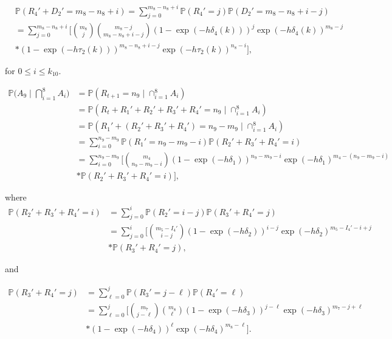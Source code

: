\documentclass[a4paper]{article}
\theoremstyle{remark}
\begin{document}

\begin{equation*}
\begin{split}
&\mathbb{P}(R_{4}'+D_{2}'=m_8-n_8+i)=\sum_{j=0}^{m_8-n_8+i} \mathbb{P}(R_{4}'=j)\mathbb{P}(D_{2}'=m_8-n_8+i-j)\\
&=\sum_{j=0}^{m_8-n_8+i}\Bigg[{m_8 \choose j}{m_8-j \choose m_8-n_8+i-j}(1-\exp(-h\delta_4(k)))^{j}\exp(-h\delta_4(k))^{m_8-j}\\
&*(1-\exp(-h\tau_2(k)))^{m_8-n_8+i-j}\exp(-h\tau_2(k))^{n_8-i}\Bigg],
\end{split}
\end{equation*}

for $0\leq i\leq k_{10}$. 



\begin{align*}
   \mathbb{P}\bigg(A_{9}\mid \bigcap_{i=1}^{8}A_{i}\bigg)&=\mathbb{P}(R_{t+1}= n_9 \mid \cap_{i=1}^{8}A_{i}) \\
   &= \mathbb{P}(R_{t}+R_{1}'+R_{2}'+R_{3}'+R_{4}'=n_9\mid \cap_{i=1}^{8}A_{i})\\
   &= \mathbb{P}(R_{1}'+(R_{2}'+R_{3}'+R_{4}')=n_9-m_9\mid \cap_{i=1}^{8}A_{i})\\
   &=\sum_{i=0}^{n_9-m_9} \mathbb{P}(R_{1}'=n_9-m_9-i)\mathbb{P}(R_{2}'+R_{3}'+R_{4}'=i)\\
   &=\sum_{i=0}^{n_9-m_9}\Bigg[{m_4 \choose n_9-m_9-i}(1-\exp(-h\delta_1))^{n_9-m_9-i}\exp(-h\delta_1)^{m_4-(n_9-m_9-i)}\\
   &*\mathbb{P}(R_{2}'+R_{3}'+R_{4}'=i)\Bigg],
\end{align*}

where
\begin{align*}
    \mathbb{P}(R_{2}'+R_{3}'+R_{4}'=i)&=\sum_{j=0}^{i} \mathbb{P}(R_{2}'=i-j)\mathbb{P}(R_{3}'+R_{4}'=j)\\
    &=\sum_{j=0}^{i}\Bigg[{m_5-I_{4}' \choose i-j}(1-\exp(-h\delta_2))^{i-j}\exp(-h\delta_2)^{m_5-I_{4}'-i+j}\\
    &*\mathbb{P}(R_{3}'+R_{4}'=j),
\end{align*}

and

\begin{align*}
    \mathbb{P}(R_{3}'+R_{4}'=j)&=\sum_{\ell=0}^{j} \mathbb{P}(R_{3}'=j-\ell)\mathbb{P}(R_{4}'=\ell)\\
    &=\sum_{\ell=0}^{j}\Bigg[{m_7 \choose j-\ell}{m_8 \choose \ell}(1-\exp(-h\delta_3))^{j-\ell}\exp(-h\delta_3)^{m_7-j+\ell}\\
    &*(1-\exp(-h\delta_4))^{\ell}\exp(-h\delta_4)^{m_8-\ell}\Bigg].
\end{align*}
\end{document}
